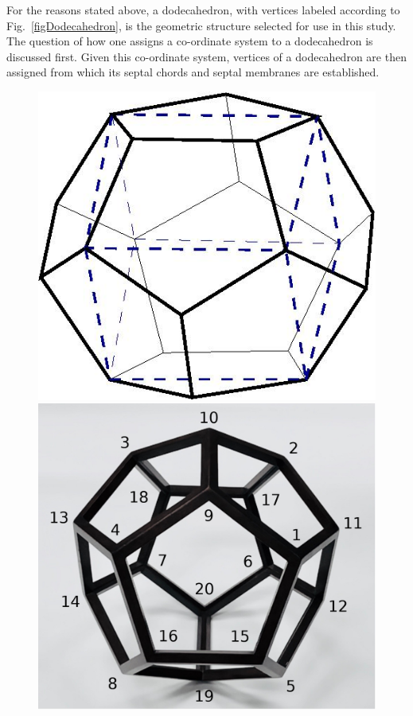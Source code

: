 For the reasons stated above, a dodecahedron, with vertices labeled according to Fig.~\ref{figDodecahedron}, is the geometric structure selected for use in this study. The question of how one assigns a co-ordinate system to a dodecahedron is discussed first.  Given this co-ordinate system, vertices of a dodecahedron are then assigned from which its septal chords and septal membranes are established.

\begin{figure}
	{\par\centering
		\resizebox*{0.45\textwidth}{0.3\textheight}
		{\includegraphics{figures/dodecahedron.jpg}} 
		\resizebox*{0.45\textwidth}{0.3\textheight}
		{\includegraphics{figures/dodecahedronVertices.jpg}}
}
\end{figure}
